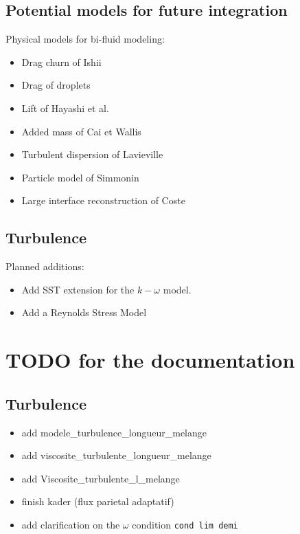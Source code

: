 \subsection{Potential models for future integration}
Physical models for bi-fluid modeling: 
\begin{itemize}
    \item[\small \textcolor{blue}{\ding{109}}] Drag churn of Ishii
    \item[\small \textcolor{blue}{\ding{109}}] Drag of droplets
    \item[\small \textcolor{blue}{\ding{109}}] Lift of Hayashi et al.
    \item[\small \textcolor{blue}{\ding{109}}] Added mass of Cai et Wallis
    \item[\small \textcolor{blue}{\ding{109}}] Turbulent dispersion of Lavieville
    \item[\small \textcolor{blue}{\ding{109}}] Particle model of Simmonin 
    \item[\small \textcolor{blue}{\ding{109}}] Large interface reconstruction of Coste
\end{itemize}

\subsection{Turbulence}
Planned additions:
\begin{itemize}
    \item Add SST extension for the $k-\omega$ model.
    \item Add a Reynolds Stress Model
\end{itemize}

\section{TODO for the documentation}
\subsection{Turbulence}
\begin{itemize}
    \item add modele\_turbulence\_longueur\_melange
    \item add viscosite\_turbulente\_longueur\_melange
    \item add Viscosite\_turbulente\_l\_melange
    \item finish kader (flux parietal adaptatif)
    \item add clarification on the $\omega$ condition \texttt{cond lim demi}
\end{itemize}

